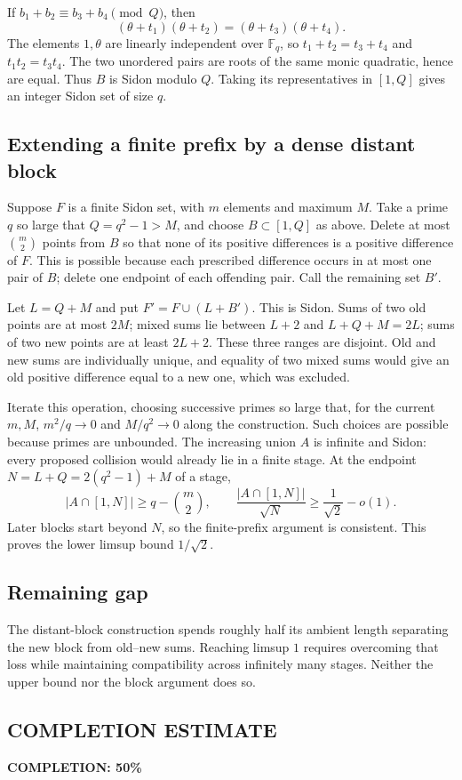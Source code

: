 If $b_1+b_2\equiv b_3+b_4\pmod Q$, then
\[
 (\theta+t_1)(\theta+t_2)=(\theta+t_3)(\theta+t_4).
\]
The elements $1,\theta$ are linearly independent over $\mathbb F_q$, so
$t_1+t_2=t_3+t_4$ and $t_1t_2=t_3t_4$. The two unordered pairs are roots of the same monic quadratic, hence are equal. Thus $B$ is Sidon modulo $Q$. Taking its representatives in $[1,Q]$ gives an integer Sidon set of size $q$.

\subsection*{Extending a finite prefix by a dense distant block}
Suppose $F$ is a finite Sidon set, with $m$ elements and maximum $M$. Take a prime $q$ so large that $Q=q^2-1>M$, and choose $B\subset[1,Q]$ as above. Delete at most $\binom m2$ points from $B$ so that none of its positive differences is a positive difference of $F$. This is possible because each prescribed difference occurs in at most one pair of $B$; delete one endpoint of each offending pair. Call the remaining set $B'$.

Let $L=Q+M$ and put $F'=F\cup(L+B')$. This is Sidon. Sums of two old points are at most $2M$; mixed sums lie between $L+2$ and $L+Q+M=2L$; sums of two new points are at least $2L+2$. These three ranges are disjoint. Old and new sums are individually unique, and equality of two mixed sums would give an old positive difference equal to a new one, which was excluded.

Iterate this operation, choosing successive primes so large that, for the current $m,M$,
$m^2/q\to0$ and $M/q^2\to0$ along the construction. Such choices are possible because primes are unbounded. The increasing union $A$ is infinite and Sidon: every proposed collision would already lie in a finite stage. At the endpoint
$N=L+Q=2(q^2-1)+M$ of a stage,
\[
 |A\cap[1,N]|\ge q-\binom m2,\qquad
 \frac{|A\cap[1,N]|}{\sqrt N}\ge\frac1{\sqrt2}-o(1).
\]
Later blocks start beyond $N$, so the finite-prefix argument is consistent. This proves the lower limsup bound $1/\sqrt2$.

\subsection*{Remaining gap}
The distant-block construction spends roughly half its ambient length separating the new block from old--new sums. Reaching limsup $1$ requires overcoming that loss while maintaining compatibility across infinitely many stages. Neither the upper bound nor the block argument does so.
\subsection*{COMPLETION ESTIMATE}
\textbf{COMPLETION: 50\%}
